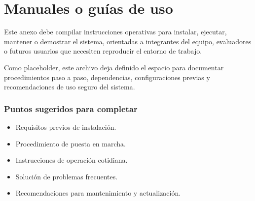 \chapter{Manuales o guías de uso}

Este anexo debe compilar instrucciones operativas para instalar, ejecutar, mantener o
demostrar el sistema, orientadas a integrantes del equipo, evaluadores o futuros usuarios
que necesiten reproducir el entorno de trabajo.

Como placeholder, este archivo deja definido el espacio para documentar procedimientos paso
a paso, dependencias, configuraciones previas y recomendaciones de uso seguro del sistema.

\subsection*{Puntos sugeridos para completar}
\begin{itemize}[leftmargin=*]
  \item Requisitos previos de instalación.
  \item Procedimiento de puesta en marcha.
  \item Instrucciones de operación cotidiana.
  \item Solución de problemas frecuentes.
  \item Recomendaciones para mantenimiento y actualización.
\end{itemize}
